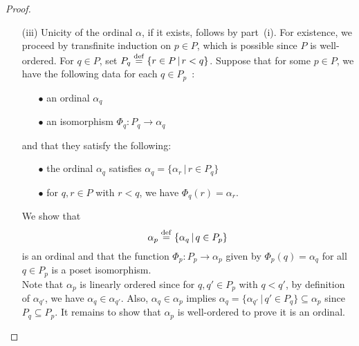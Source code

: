 \begin{proof}
\begin{itemize}
        \item[(iii)] Unicity of the ordinal $\alpha$, if it exists, follows by part~(i). For existence, we proceed by transfinite induction on $p \in P$, which is possible since $P$ is well-ordered. For $q \in P$, set $P_q \overset{\mathrm{def}}{=} \{ r \in P \, | \, r < q \}$. Suppose that for some $p \in P$, we have the following data for each $q \in P_p$~:
        \\

        \begin{itemize}
            \item[$\bullet$] an ordinal $\alpha_q$
            \\

            \item[$\bullet$] an isomorphism $\Phi_q : P_q \to \alpha_q$
            \\

        \end{itemize}
        and that they satisfy the following:
        \\

        \begin{itemize}
            \item[$\bullet$] the ordinal $\alpha_q$ satisfies $\alpha_q = \{ \alpha_r \, | \, r \in P_q \}$
            \\            
            
            \item[$\bullet$] for $q,r \in P$ with $r < q$, we have $\Phi_q(r) = \alpha_r$.
            \\ 
        \end{itemize}

        We show that 
        \[
            \alpha_p \overset{\mathrm{def}}{=} \{ \alpha_q \, | \, q \in P_p \}    
        \]
        is an ordinal and that the function $\Phi_p : P_p \to \alpha_p$ given by $\Phi_p(q) = \alpha_q$ for all $q \in P_p$ is a poset isomorphism. 
        \\

        Note that $\alpha_p$ is linearly ordered since for $q,q' \in P_p$ with $q < q'$, by definition of $\alpha_{q'}$, we have $\alpha_q \in \alpha_{q'}$. Also, $\alpha_q \in \alpha_p$ implies $\alpha_q = \{ \alpha_{q'} \, | \, q' \in P_q \} \subseteq \alpha_p$ since $P_q \subseteq P_p$. It remains to show that $\alpha_p$ is well-ordered to prove it is an ordinal.
        \\
        

\end{itemize}
\end{proof}
